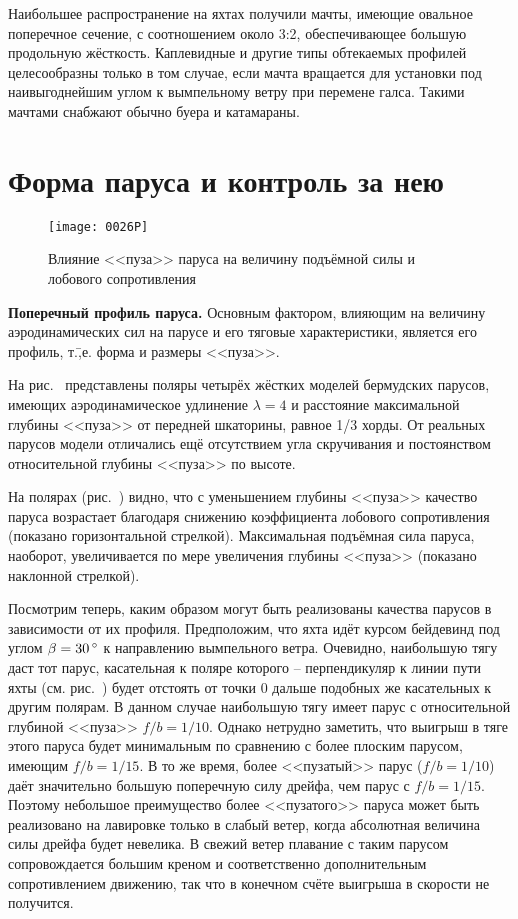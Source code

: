 Наибольшее распространение на яхтах получили мачты, имеющие овальное поперечное сечение, с соотношением около 3:2, обеспечивающее большую продольную жёсткость. Каплевидные и другие типы обтекаемых профилей целесообразны только в том случае, если мачта вращается для установки под наивыгоднейшим углом к вымпельному ветру при перемене галса. Такими мачтами снабжают обычно буера и катамараны.

\section{Форма паруса и контроль за нею}

\begin{figure}[htb]
  \centering
  \texttt{[image: 0026P]}
  \caption{Влияние <<пуза>> паруса на величину подъёмной силы и лобового сопротивления}
  \label{fig:26}
\end{figure}

\textbf{Поперечный профиль паруса.} Основным фактором, влияющим на величину аэродинамических сил на парусе и его тяговые характеристики, является его профиль, т.\=,е. форма и размеры <<пуза>>.

На рис.~ представлены поляры четырёх жёстких моделей бермудских парусов, имеющих аэродинамическое удлинение $\lambda = 4$ и расстояние максимальной глубины <<пуза>> от передней шкаторины, равное 1/3 хорды. От реальных парусов модели отличались ещё отсутствием угла скручивания и постоянством относительной глубины <<пуза>> по высоте.

На полярах (рис.~) видно, что с уменьшением глубины <<пуза>> качество паруса возрастает благодаря снижению коэффициента лобового сопротивления (показано горизонтальной стрелкой). Максимальная подъёмная сила паруса, наоборот, увеличивается по мере увеличения глубины <<пуза>> (показано наклонной стрелкой).

Посмотрим теперь, каким образом могут быть реализованы качества парусов в зависимости от их профиля. Предположим, что яхта идёт курсом бейдевинд под углом $\beta = 30\,^\circ$ к направлению вымпельного ветра. Очевидно, наибольшую тягу даст тот парус, касательная к поляре которого \--- перпендикуляр к линии пути яхты (см. рис.~) будет отстоять от точки 0 дальше подобных же касательных к другим полярам. В данном случае наибольшую тягу имеет парус с относительной глубиной <<пуза>> $f/b=1/10$. Однако нетрудно заметить, что выигрыш в тяге этого паруса будет минимальным по сравнению с более плоским парусом, имеющим $f/b = 1/15$. В то же время, более <<пузатый>> парус ($f/b = 1/10$) даёт значительно большую поперечную силу дрейфа, чем парус с $f/b = 1/15$. Поэтому небольшое преимущество более <<пузатого>> паруса может быть реализовано на лавировке только в слабый ветер, когда абсолютная величина силы дрейфа будет невелика. В свежий ветер плавание с таким парусом сопровождается большим креном и соответственно дополнительным сопротивлением движению, так что в конечном счёте выигрыша в скорости не получится. 

